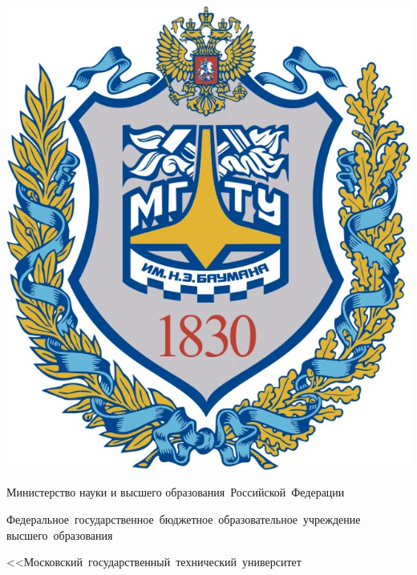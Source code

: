 \def\myname{Смирнов И.В.}
\def\mygroup{ИУ7-52Б}
\def\mytheme{Разработка программного обеспечения для моделирования упругих столкновений объектов в пространстве}

\begin{titlepage}
    \fontsize{12pt}{12pt}\selectfont

    \noindent
    \begin{center}
        \begin{minipage}{0.14\textwidth}
            \includegraphics[width=\linewidth]{img/bmstu_logo.jpg}
        \end{minipage}
        \hfill
        \begin{minipage}{0.85\textwidth}\centering\bfseries
            {
                \linespread{1}\selectfont
                \vspace{0.1cm}
                {Министерство науки и высшего образования~Российской~Федерации}

                {Федеральное~государственное~бюджетное~образовательное~учреждение высшего~образования}

                {
                    <<Московский~государственный~технический~университет

}}
\end{minipage}
\end{center}
\end{titlepage}
